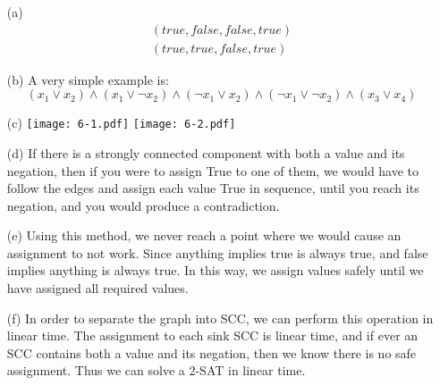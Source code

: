 \documentclass[11pt]{article}
\begin{document}
\begin{itemize}
\item[(a)]
\begin{eqnarray*}
(true, false, false, true)\\
(true, true, false, true)
\end{eqnarray*}
\item[(b)]
A very simple example is:
\begin{equation*}
(x_1 \lor x_2) \land (x_1 \lor \lnot x_2) \land (\lnot x_1 \lor x_2) \land
(\lnot x_1 \lor \lnot x_2) \land (x_3 \lor x_4)
\end{equation*}
\item[(c)]
\texttt{[image: 6-1.pdf]}
\texttt{[image: 6-2.pdf]}
\item[(d)]
If there is a strongly connected component with both a value and its negation,
then if you were to assign True to one of them, we would have to follow the
edges and assign each value True in sequence, until you reach its negation, and
you would produce a contradiction. 
\item[(e)]
Using this method, we never reach a point where we would cause an assignment to
not work. 
Since anything implies true is always true, and false implies anything is always
true. In this way, we assign values safely until we have assigned all required
values. 
\item[(f)]
In order to separate the graph into SCC, we can perform this operation in linear
time. The assignment to each sink SCC is linear time, and if ever an SCC
contains both a value and its negation, then we know there is no safe
assignment. Thus we can solve a 2-SAT in linear time. 
\end{itemize}
\end{document}

